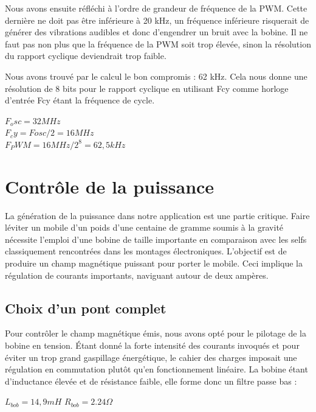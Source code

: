 \documentclass[11pt, french]{article} %
\begin{document}
Nous avons ensuite réfléchi à l'ordre de grandeur de fréquence de la PWM. Cette dernière ne doit pas être inférieure à 20 kHz, un fréquence inférieure risquerait de générer des vibrations audibles et donc d'engendrer un bruit avec la bobine. Il ne faut pas non plus que la fréquence de la PWM soit trop élevée, sinon la résolution du rapport cyclique deviendrait trop faible.

Nous avons trouvé par le calcul le bon compromis : 62 kHz. Cela nous donne une résolution de 8 bits pour le rapport cyclique en utilisant Fcy comme horloge d'entrée Fcy étant la fréquence de cycle.
\begin{center}
$F_osc = 32MHz$
\\$F_cy = Fosc/2 = 16MHz$
\\$F_PWM = 16MHz/2^8 = 62,5kHz$
\end{center}
\vspace{0.5cm}


\section{Contrôle de la puissance}

	La génération de la puissance dans notre application est une partie critique. Faire léviter un mobile d'un poids d'une centaine de gramme soumis à la gravité nécessite l'emploi d'une bobine de taille importante en comparaison avec les selfs classiquement rencontrées dans les montages électroniques. L'objectif est de produire un champ magnétique puissant pour porter le mobile. Ceci implique la régulation de courants importants, naviguant autour de deux ampères. 

\subsection{Choix d'un pont complet}
	Pour contrôler le champ magnétique émis, nous avons opté pour le pilotage de la bobine en tension. Étant donné la forte intensité des courants invoqués et pour éviter un trop grand gaspillage énergétique, le cahier des charges imposait une régulation en commutation plutôt qu'en fonctionnement linéaire. La bobine étant d'inductance élevée et de résistance faible, elle forme donc un filtre passe bas :

\medskip
$ L_{bob} = 14,9 mH $
$ R_{bob} = 2.24 \Omega $
\end{document}
